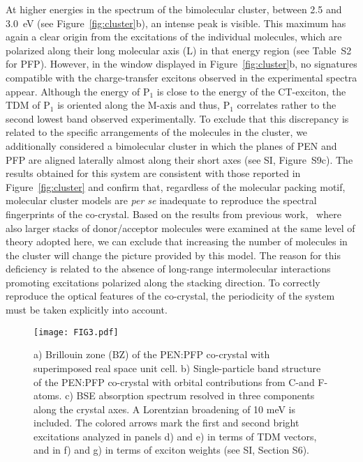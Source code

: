 \documentclass[journal=jpclcd,manuscript=letter]{achemso}
\begin{document}
At higher energies in the spectrum of the bimolecular cluster, between 2.5 and 3.0~eV (see Figure~\ref{fig:cluster}b), an intense peak is visible. 
This maximum has again a clear origin from the excitations of the individual molecules, which are polarized along their long molecular axis (L) in that energy region (see Table~S2 for PFP).
However, in the %
window displayed in Figure~\ref{fig:cluster}b, no signatures compatible with the charge-transfer excitons observed in the experimental spectra appear. Although the energy of P$_1$ is close to the energy of the CT-exciton, the TDM of P$_1$ is oriented along the M-axis and thus, P$_1$ correlates rather to the second lowest band observed experimentally. 
To exclude that this discrepancy is related to the specific arrangements of the molecules in the cluster, we additionally considered a bimolecular cluster in which the planes of PEN and PFP are aligned laterally almost along their short axes (see SI, Figure~S9c).
The results obtained for this system are consistent with those reported in Figure~\ref{fig:cluster} and confirm that, regardless of the  molecular packing motif, molecular cluster models are \textit{per se} inadequate to reproduce the spectral fingerprints of the co-crystal. 
Based on the results from previous work,~\cite{vale+20pccp,theu+21jpcc} where also larger stacks of donor/acceptor molecules were examined at the same level of theory adopted here, we can exclude that increasing the number of molecules in the cluster will change the picture provided by this model. 
The reason for this deficiency is related to the absence of long-range intermolecular interactions~\cite{guer+21jpcc} promoting excitations polarized along the stacking direction.
To correctly reproduce the optical features of the co-crystal, the periodicity of the system must be taken explicitly into account.

%
\begin{figure}[h!]
	\centering
\texttt{[image: FIG3.pdf]}
	\caption{a) Brillouin zone (BZ) of the PEN:PFP co-crystal with superimposed real space unit cell. b) Single-particle band structure of the PEN:PFP co-crystal with orbital contributions from C-and F-atoms. %
	c) BSE absorption spectrum resolved in three components along the crystal axes. A Lorentzian broadening of 10 meV is included. The colored arrows mark the first and second bright excitations analyzed in panels d) and e) in terms of TDM vectors, and in f) and g) in terms of exciton weights (see SI, Section S6). 
	} 
	\label{fig:optic}
\end{figure}
%
\end{document}
